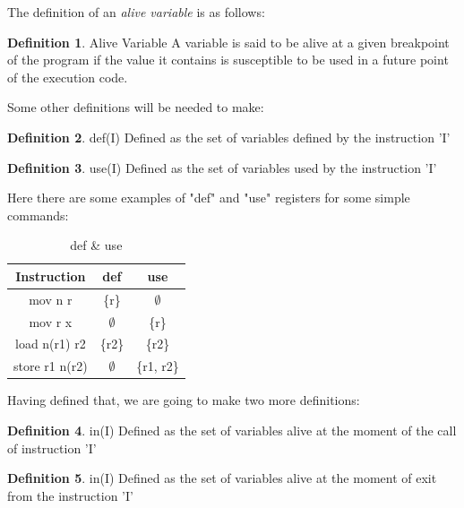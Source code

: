 \documentclass[conference]{IEEEtran}
\theoremstyle{definition}
\newtheorem{definition}{Definition}[section]
\begin{document}
The definition of an \textit{alive variable} is as follows:

\theoremstyle{definition}
\begin{definition}{Alive Variable}
	A variable is said to be alive at a given breakpoint of the program if the value it contains is susceptible to be used in a future point of the execution code.
\end{definition}

Some other definitions will be needed to make:

\theoremstyle{definition}
\begin{definition}{def(I)}
	Defined as the set of variables defined by the instruction 'I'
\end{definition}
\theoremstyle{definition}
\begin{definition}{use(I)}
	Defined as the set of variables used by the instruction 'I'
\end{definition}

Here there are some examples of "def" and "use" registers for some simple commands:

\begin{table}[H]
	\begin{center}
		\begin{tabular}{||c | c | c||}
			\hline
			Instruction & def & use  \\ [0.5ex] 
			\hline\hline
			mov n r & \{r\} &   $\emptyset$ \\ 
			\hline
			mov r x & $\emptyset$ & \{r\} \\
			\hline
			load n(r1) r2 & \{r2\} & \{r2\} \\
			\hline
			store r1 n(r2) & $\emptyset$ & \{r1, r2\} \\
			\hline
		\end{tabular}
	\end{center}
	\caption{def \& use} \label{tab:def-and-use}
\end{table}

Having defined that, we are going to make two more definitions:

\theoremstyle{definition}
\begin{definition}{in(I)}
	Defined as the set of variables alive at the moment of the call of instruction 'I' 
\end{definition}
\theoremstyle{definition}
\begin{definition}{in(I)}
	Defined as the set of variables alive at the moment of exit from the instruction 'I'
\end{definition}
\end{document}
